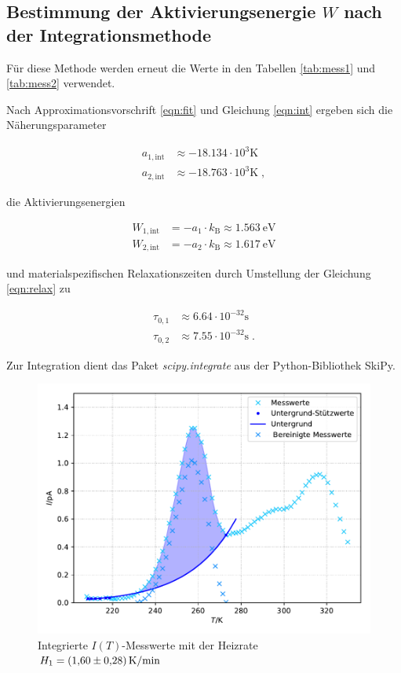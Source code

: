 \subsection{Bestimmung der Aktivierungsenergie $W$ nach der Integrationsmethode}

Für diese Methode werden erneut die Werte in den Tabellen \ref{tab:mess1} und \ref{tab:mess2} verwendet.

Nach Approximationsvorschrift \eqref{eqn:fit} und Gleichung \eqref{eqn:int} ergeben sich die
Näherungsparameter 

\begin{align*}
  a_{1,\text{int}} &\approx \num{-18.134} \cdot 10^3 \si{\kelvin} \\
  a_{2,\text{int}} &\approx \num{-18.763} \cdot 10^3 \si{\kelvin}  \; ,
\end{align*}

die Aktivierungsenergien

\begin{align*}
  W_{1,\text{int}} &= -a_1 \cdot k_\text{B} \approx \SI{1.563}{\eV} \\
  W_{2,\text{int}} &= -a_2 \cdot k_\text{B} \approx \SI{1.617}{\eV}
\end{align*}

und materialspezifischen Relaxationszeiten durch Umstellung der Gleichung \eqref{eqn:relax} zu

\begin{align*}
  \tau_{0,1} &\approx \num{6.64} \cdot 10^{-32} \si{\second}\\
  \tau_{0,2} &\approx \num{7.55} \cdot 10^{-32} \si{\second} \; .
\end{align*}

Zur Integration dient das Paket \textit{scipy.integrate} aus der Python-Bibliothek SkiPy.

\begin{figure}[H]
  \centering
  \includegraphics[scale=0.7]{content/plot3.pdf}
  \caption{Integrierte $I(T)$-Messwerte mit der Heizrate $H_1 = \SI{1.60 +- 0.28}{\kelvin\per\minute}$}
  \label{fig:plot3}
\end{figure}

